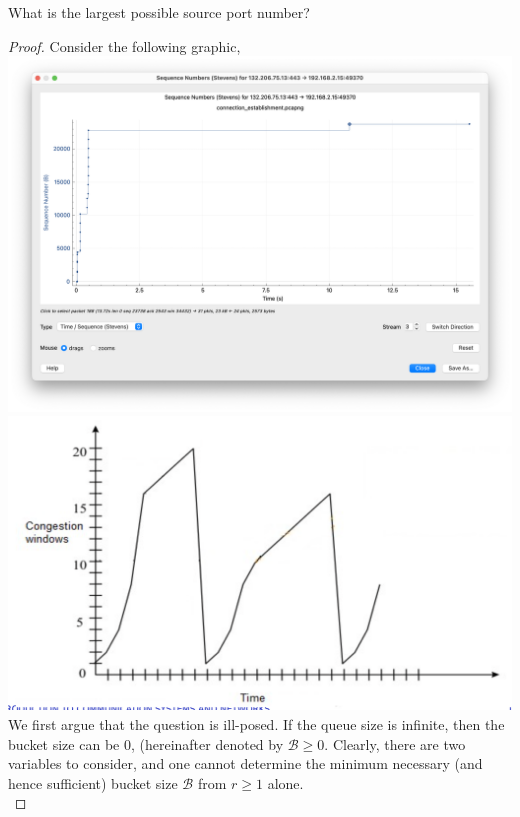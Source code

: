 \documentclass[../../main.tex]{subfiles}
\begin{document}
\begin{wts}
What is the largest possible source port number?  
\end{wts}
\providecommand{\xn}{\{x_n\}}
\providecommand{\buck}{\mathcal{B}}
\providecommand{\queue}{\mathcal{Q}}

\begin{proof}
    Consider the following graphic,\\
    \includegraphics[width=\textwidth]{subfiles/images/connection_bytestream_plot_Q19_server_to_client.png}
    \includegraphics[width=\textwidth]{subfiles/images/part3_q19_window_graphic.png}
    We first argue that the question is ill-posed. If the queue size is infinite, then the bucket size can be $0$, (hereinafter denoted by $\mathcal{B}\geq 0$. Clearly, there are two variables to consider, and one cannot determine the minimum necessary (and hence sufficient) bucket size $\buck$ from $r\geq 1$ alone.\\
    

\end{proof}
\end{document}
